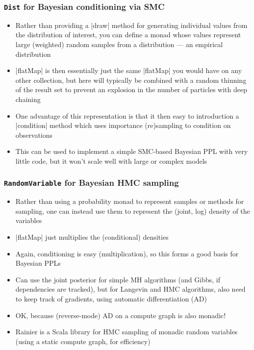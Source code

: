 \documentclass[mathserif,handout]{beamer}
\begin{document}
\begin{frame}[fragile]
  \frametitle{\texttt{Dist} for Bayesian conditioning via SMC}
  \begin{itemize}
  \item Rather than providing a |draw| method for generating individual values from the distribution of interest, you can define a monad whose values represent large (weighted) random samples from a distribution --- an empirical distribution
  \item |flatMap| is then essentially just the same |flatMap| you would have on any other collection, but here will typically be combined with a random thinning of the result set to prevent an explosion in the number of particles with deep chaining
  \item One advantage of this representation is that it then easy to introduction a |condition| method which uses importance (re)sampling to condition on observations
    \item This can be used to implement a simple SMC-based Bayesian PPL with very little code, but it won't scale well with large or complex models
    \end{itemize}
\end{frame}

\begin{frame}[fragile]
  \frametitle{\texttt{RandomVariable} for Bayesian HMC sampling}
  \begin{itemize}
  \item Rather than using a probability monad to represent samples or methods for sampling, one can instead use them to represent the (joint, log) density of the variables
    \item |flatMap| just multiplies the (conditional) densities
    \item Again, conditioning is easy (multiplication), so this forms a good basis for Bayesian PPLs
    \item Can use the joint posterior for simple MH algorithms (and Gibbs, if dependencies are tracked), but for Langevin and HMC algorithms, also need to keep track of gradients, using automatic differentiation (AD)
      \item OK, because (reverse-mode) AD on a compute graph is also monadic!
    \item \alert{Rainier} is a Scala library for HMC sampling of monadic random variables (using a static compute graph, for efficiency)
    \end{itemize}
\end{frame}
\end{document}
